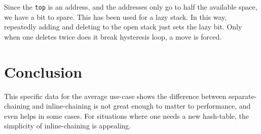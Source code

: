 \documentclass[12pt]{article}
\newcommand{\code}[1]{\colorbox{light-gray}{\texttt{#1}}}
\begin{document}
Since the \code{top} is an address, and the addresses only go to half the available space, we have a bit to spare. This has been used for a lazy stack. In this way, repeatedly adding and deleting to the open stack just sets the lazy bit. Only when one deletes twice does it break hysteresis loop, a move is forced.

\section{Conclusion}

This specific data for the average use-case shows the difference between separate-chaining and inline-chaining is not great enough to matter to performance, and even helps in some cases. For situations where one needs a new hash-table, the simplicity of inline-chaining is appealing.


\end{document}
